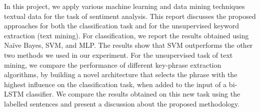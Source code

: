 


In this project, we apply various machine learning and data mining techniques textual data for the task of sentiment analysis. This report discusses the proposed approaches for both the classification task and for the unsupervised keyword extraction (text mining). For classification, we report the results obtained using Naïve Bayes, SVM, and MLP. The results show that SVM outperforms the other two methods we used in our experiment. For the unsupervised task of text mining, we compare the performance of different key-phrase extraction algorithms, by building a novel architecture that selects the phrase with the highest influence on the classification task, when added to the input of a bi-LSTM classifier. We compare the results obtained on this new task using the labelled sentences and present a discussion about the proposed methodology.